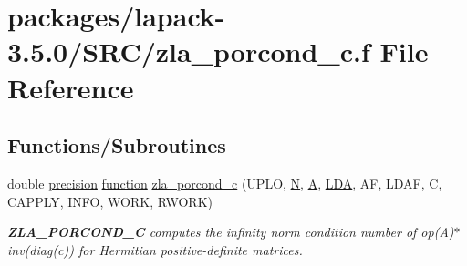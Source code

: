 \hypertarget{zla__porcond__c_8f}{}\section{packages/lapack-\/3.5.0/\+S\+R\+C/zla\+\_\+porcond\+\_\+c.f File Reference}
\label{zla__porcond__c_8f}
\subsection*{Functions/\+Subroutines}
\begin{DoxyCompactItemize}
\item 
double \hyperlink{numinquire_8h_a2c8e616467665d0b2814d4c1589ba74e}{precision} \hyperlink{afunc_8m_a7b5e596df91eadea6c537c0825e894a7}{function} \hyperlink{group__complex16POcomputational_ga82c32fc3a1b85760efa07df079d03451}{zla\+\_\+porcond\+\_\+c} (U\+P\+L\+O, \hyperlink{polmisc_8c_a0240ac851181b84ac374872dc5434ee4}{N}, \hyperlink{classA}{A}, \hyperlink{example__user_8c_ae946da542ce0db94dced19b2ecefd1aa}{L\+D\+A}, A\+F, L\+D\+A\+F, C, C\+A\+P\+P\+L\+Y, I\+N\+F\+O, W\+O\+R\+K, R\+W\+O\+R\+K)
\begin{DoxyCompactList}\small\item\em {\bfseries Z\+L\+A\+\_\+\+P\+O\+R\+C\+O\+N\+D\+\_\+\+C} computes the infinity norm condition number of op(\+A)$\ast$inv(diag(c)) for Hermitian positive-\/definite matrices. \end{DoxyCompactList}\end{DoxyCompactItemize}
